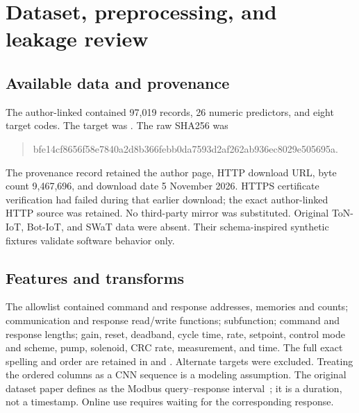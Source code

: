 \documentclass[11pt,a4paper]{report}
\begin{document}
\chapter{Dataset, preprocessing, and leakage review}
\section{Available data and provenance}
The author-linked  contained 97,019 records, 26 numeric predictors, and eight target codes. The target was . The raw SHA256 was
\begin{quote}\small\ttfamily\sloppy bfe14cf8656f58e7840a2d8b366febb0da7593d2af262ab936ec8029e505695a.\end{quote}
The provenance record retained the author page, HTTP download URL, byte count 9,467,696, and download date 5 November 2026. HTTPS certificate verification had failed during that earlier download; the exact author-linked HTTP source was retained. No third-party mirror was substituted. Original ToN-IoT, Bot-IoT, and SWaT data were absent. Their schema-inspired synthetic fixtures validate software behavior only.

\section{Features and transforms}
The allowlist contained command and response addresses, memories and counts; communication and response read/write functions; subfunction; command and response lengths; gain, reset, deadband, cycle time, rate, setpoint, control mode and scheme, pump, solenoid, CRC rate, measurement, and time. The full exact spelling and order are retained in  and . Alternate targets were excluded. Treating the ordered columns as a CNN sequence is a modeling assumption. The original dataset paper defines  as the Modbus query--response interval~\cite{morris2014}; it is a duration, not a timestamp. Online use requires waiting for the corresponding response.
\end{document}
